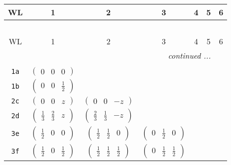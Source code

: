 \documentclass[fleqn,9pt,landscape]{jsarticle}
\begin{document}
\begin{center}
\renewcommand{\arraystretch}{1.2}
\begin{longtable}{ccccccc}
 \hline \hline
WL & 1 & 2 & 3 & 4 & 5 & 6 \\ \hline \endfirsthead

\multicolumn{6}{l}{\tablename\ \thetable{}} \\
 \hline \hline
WL & 1 & 2 & 3 & 4 & 5 & 6 \\ \hline \endhead

 \hline \hline
\multicolumn{6}{r}{\footnotesize\it continued ...} \\ \endfoot

 \hline \hline
\multicolumn{6}{r}{} \\ \endlastfoot

{\tt 1a} & $ \begin{pmatrix} 0 & 0 & 0 \end{pmatrix} $ & $  $ & $  $ & $  $ & $  $ & $  $ \\ \hline
{\tt 1b} & $ \begin{pmatrix} 0 & 0 & \frac{1}{2} \end{pmatrix} $ & $  $ & $  $ & $  $ & $  $ & $  $ \\ \hline
{\tt 2c} & $ \begin{pmatrix} 0 & 0 & z \end{pmatrix} $ & $ \begin{pmatrix} 0 & 0 & - z \end{pmatrix} $ & $  $ & $  $ & $  $ & $  $ \\ \hline
{\tt 2d} & $ \begin{pmatrix} \frac{1}{3} & \frac{2}{3} & z \end{pmatrix} $ & $ \begin{pmatrix} \frac{2}{3} & \frac{1}{3} & - z \end{pmatrix} $ & $  $ & $  $ & $  $ & $  $ \\ \hline
{\tt 3e} & $ \begin{pmatrix} \frac{1}{2} & 0 & 0 \end{pmatrix} $ & $ \begin{pmatrix} \frac{1}{2} & \frac{1}{2} & 0 \end{pmatrix} $ & $ \begin{pmatrix} 0 & \frac{1}{2} & 0 \end{pmatrix} $ & $  $ & $  $ & $  $ \\ \hline
{\tt 3f} & $ \begin{pmatrix} \frac{1}{2} & 0 & \frac{1}{2} \end{pmatrix} $ & $ \begin{pmatrix} \frac{1}{2} & \frac{1}{2} & \frac{1}{2} \end{pmatrix} $ & $ \begin{pmatrix} 0 & \frac{1}{2} & \frac{1}{2} \end{pmatrix} $ & $  $ & $  $ & $  $ \\ \hline

\end{longtable}
\end{center}
\end{document}
